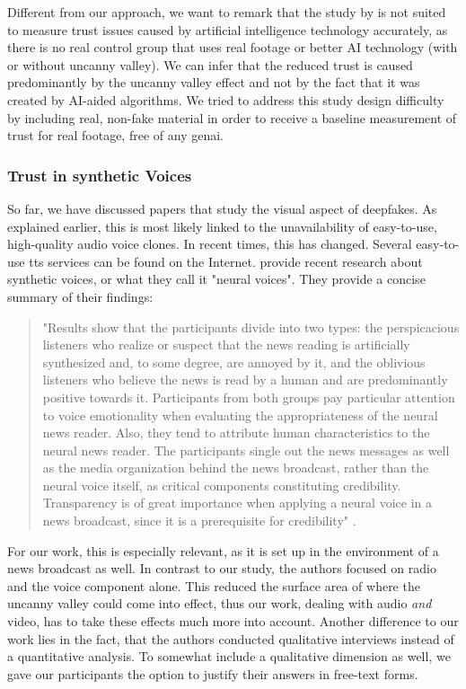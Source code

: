 \documentclass[
  a4paper,  %
  twoside,  %
  bibliography=totoc,
  headsepline,
  cleardoublepage=empty,
  parskip=half,
  draft=false
]{scrbook}
\begin{document}
Different from our approach, we want to remark that the study by  is not suited to measure trust issues caused by artificial intelligence technology accurately, as there is no real control group that uses real footage or better AI technology (with or without uncanny valley). We can infer that the reduced trust is caused predominantly by the uncanny valley effect and not by the fact that it was created by AI-aided algorithms. We tried to address this study design difficulty by including real, non-fake material in order to receive a baseline measurement of trust for real footage, free of any \gls{genai}.

\subsubsection*{Trust in synthetic Voices}
So far, we have discussed papers that study the visual aspect of deepfakes. As explained earlier, this is most likely linked to the unavailability of easy-to-use, high-quality audio voice clones. In recent times, this has changed. Several easy-to-use \gls{tts} services can be found on the Internet.  provide recent research about synthetic voices, or what they call it "neural voices". They provide a concise summary of their findings: 

\begin{quotation}
"Results show that the participants divide into two types: the perspicacious listeners who realize or suspect that the news reading is artificially synthesized and, to some degree, are annoyed by it, and the oblivious listeners who believe the news is read by a human and are predominantly positive towards it. Participants from both groups pay particular attention to voice emotionality when evaluating the appropriateness of the neural news reader. Also, they tend to attribute human characteristics to the neural news reader. The participants single out the news messages as well as the media organization behind the news broadcast, rather than the neural voice itself, as critical components constituting credibility. Transparency is of great importance when applying a neural voice in a news broadcast, since it is a prerequisite for credibility" \cite{heiselbergAutomatedNewsReading2022}.
\end{quotation} 

For our work, this is especially relevant, as it is set up in the environment of a news broadcast as well. In contrast to our study, the authors focused on radio and the voice component alone. This reduced the surface area of where the uncanny valley could come into effect, thus our work, dealing with audio \textit{and} video, has to take these effects much more into account. Another difference to our work lies in the fact, that the authors conducted qualitative interviews instead of a quantitative analysis. To somewhat include a qualitative dimension as well, we gave our participants the option to justify their answers in free-text forms. 
\end{document}
